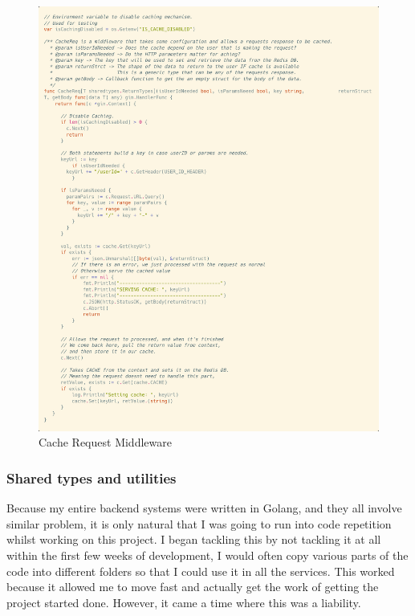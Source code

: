\documentclass[titlepage]{article}
\begin{document}
\begin{figure}
  \includegraphics[width=\textwidth]{../Diagrams/cachereq.png}
  \caption{Cache Request Middleware}
  \label{cachereq}
\end{figure}

\pagebreak
\subsubsection{Shared types and utilities}
Because my entire backend systems were written in Golang, and they all involve similar problem, it is only natural that I was going to run into code repetition whilst working on this project. I began tackling this by not tackling it at all within the first few weeks of development, I would often copy various parts of the code into different folders so that I could use it in all the services. This worked because it allowed me to move fast and actually get the work of getting the project started done. However, it came a time where this was a liability. \\
\end{document}
